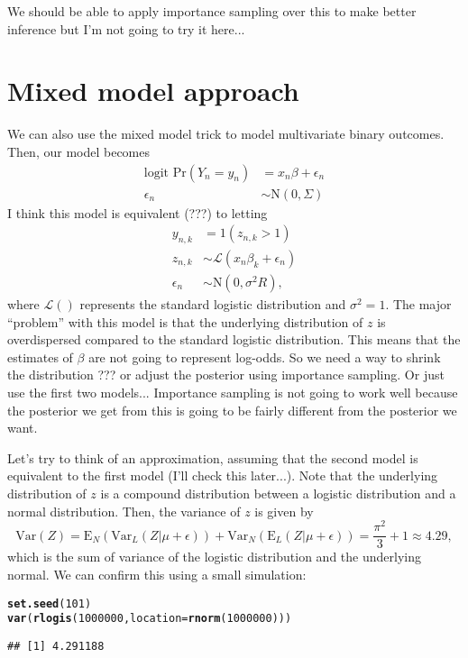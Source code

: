 \documentclass{article}\usepackage[]{graphicx}\usepackage[]{color}
\makeatletter
\newcommand{\hlnum}[1]{\textcolor[rgb]{0.686,0.059,0.569}{#1}}%
\newcommand{\hlstd}[1]{\textcolor[rgb]{0.345,0.345,0.345}{#1}}%
\newcommand{\hlkwc}[1]{\textcolor[rgb]{0.333,0.667,0.333}{#1}}%
\newcommand{\hlkwd}[1]{\textcolor[rgb]{0.737,0.353,0.396}{\textbf{#1}}}%
\newenvironment{kframe}{%
 \def\at@end@of@kframe{}%
 \ifinner\ifhmode%
  \def\at@end@of@kframe{\end{minipage}}%
  \begin{minipage}{\columnwidth}%
 \fi\fi%
 \def\FrameCommand##1{\hskip\@totalleftmargin \hskip-\fboxsep
 \colorbox{shadecolor}{##1}\hskip-\fboxsep
     \hskip-\linewidth \hskip-\@totalleftmargin \hskip\columnwidth}%
 \MakeFramed {\advance\hsize-\width
   \@totalleftmargin\z@ \linewidth\hsize
   \@setminipage}}%
 {\par\unskip\endMakeFramed%
 \at@end@of@kframe}
\newenvironment{knitrout}{}{} %
\makeatother
\begin{document}
We should be able to apply importance sampling over this to make better inference but I'm not going to try it here...

\section{Mixed model approach}

We can also use the mixed model trick to model multivariate binary outcomes. Then, our model becomes
\begin{equation}
\begin{aligned}
\textrm{logit Pr}(Y_n = y_n) &= x_n \beta + \epsilon_n\\
\epsilon_n &\sim \mathrm{N}(0, \Sigma)
\end{aligned}
\end{equation}
I think this model is equivalent (???) to letting 
\begin{equation}
\begin{aligned}
y_{n,k} &= 1(z_{n,k} > 1)\\
z_{n,k} &\sim \mathcal L(x_{n} \beta_k + \epsilon_n) \\
\epsilon_n &\sim \mathrm{N}(0, \sigma^2 R),
\end{aligned}
\end{equation}
where $\mathcal L()$ represents the standard logistic distribution and $\sigma^2 = 1$.
The major ``problem'' with this model is that the underlying distribution of $z$ is overdispersed compared to the standard logistic distribution. 
This means that the estimates of $\beta$ are not going to represent log-odds.
So we need a way to shrink the distribution ??? or adjust the posterior using importance sampling.
Or just use the first two models... Importance sampling is not going to work well because the posterior we get from this is going to be fairly different from the posterior we want.

Let's try to think of an approximation, assuming that the second model is equivalent to the first model (I'll check this later...).
Note that the underlying distribution of $z$ is a compound distribution between a logistic distribution and a normal distribution. Then, the variance of $z$ is given by
$$
\mathrm{Var}(Z) = \mathrm{E}_N(\mathrm{Var}_L(Z|\mu + \epsilon)) + \mathrm{Var}_N(\mathrm{E}_L(Z|\mu + \epsilon)) = \frac{\pi^2}{3} + 1 \approx 4.29,
$$
which is the sum of variance of the logistic distribution and the underlying normal.
We can confirm this using a small simulation:
\begin{knitrout}
\color{fgcolor}\begin{kframe}
\begin{alltt}
\hlkwd{set.seed}\hlstd{(}\hlnum{101}\hlstd{)}
\hlkwd{var}\hlstd{(}\hlkwd{rlogis}\hlstd{(}\hlnum{1000000}\hlstd{,} \hlkwc{location}\hlstd{=}\hlkwd{rnorm}\hlstd{(}\hlnum{1000000}\hlstd{)))}
\end{alltt}
\begin{verbatim}
## [1] 4.291188
\end{verbatim}
\end{kframe}
\end{knitrout}
\end{document}
